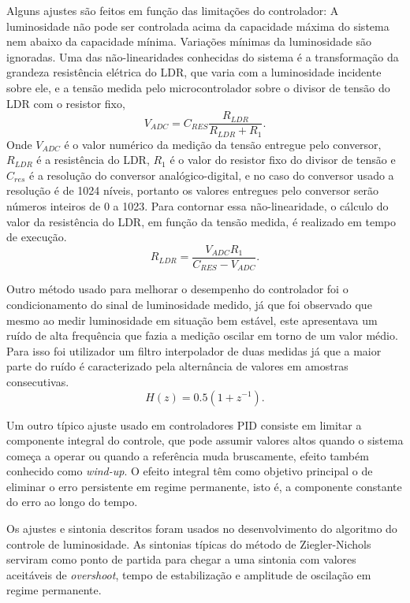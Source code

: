 Alguns ajustes são feitos em função das limitações do controlador: A luminosidade não pode ser controlada acima da capacidade máxima do sistema nem abaixo da capacidade mínima. Variações mínimas da luminosidade são ignoradas. Uma das não-linearidades conhecidas do sistema é a transformação da grandeza resistência elétrica do LDR, que varia com a luminosidade incidente sobre ele, e a tensão medida pelo microcontrolador sobre o divisor de tensão do LDR com o resistor fixo,
\begin{equation}
    \label{eq:prj1}
    V_{ADC} = C_{RES}\frac{R_{LDR}}{R_{LDR} + R_1}.
\end{equation}
Onde $V_{ADC}$ é o valor numérico da medição da tensão entregue pelo conversor, $R_{LDR}$ é a resistência do LDR, $R_1$ é o valor do resistor fixo do divisor de tensão e $C_{res}$ é a resolução do conversor analógico-digital, e no caso do conversor usado a resolução é de 1024 níveis, portanto os valores entregues pelo conversor serão números inteiros de 0 a 1023. Para contornar essa não-linearidade, o cálculo do valor da resistência do LDR, em função da tensão medida, é realizado em tempo de execução.
\begin{equation}
    \label{eq:prj1.1}
    R_{LDR} = \frac{V_{ADC}R_1}{C_{RES} - V_{ADC}}.
\end{equation}

Outro método usado para melhorar o desempenho do controlador foi o condicionamento do sinal de luminosidade medido, já que foi observado que mesmo ao medir luminosidade em situação bem estável, este apresentava um ruído de alta frequência que fazia a medição oscilar em torno de um valor médio. Para isso foi utilizador um filtro interpolador de duas medidas já que a maior parte do ruído é caracterizado pela alternância de valores em amostras consecutivas.
\begin{equation}
    \label{eq:prj2}
    H(z) = 0.5(1 + z^{-1}).
\end{equation}

Um outro típico ajuste usado em controladores PID consiste em limitar a componente integral do controle, que pode assumir valores altos quando o sistema começa a operar ou quando a referência muda bruscamente, efeito também conhecido como \textit{wind-up}. O efeito integral têm como objetivo principal o de eliminar o erro persistente em regime permanente, isto é, a componente constante do erro ao longo do tempo.

Os ajustes e sintonia descritos foram usados no desenvolvimento do algoritmo do controle de luminosidade. As sintonias típicas do método de Ziegler-Nichols serviram como ponto de partida para chegar a uma sintonia com valores aceitáveis de \textit{overshoot}, tempo de estabilização e amplitude de oscilação em regime permanente.